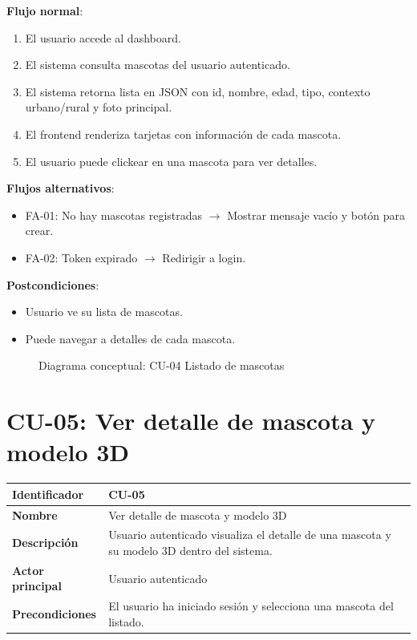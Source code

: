 \documentclass[12pt,a4paper]{article}
\begin{document}
\vspace{0.5em}

\textbf{Flujo normal}:
\begin{enumerate}[leftmargin=*]
    \item El usuario accede al dashboard.
    \item El sistema consulta mascotas del usuario autenticado.
    \item El sistema retorna lista en JSON con id, nombre, edad, tipo, contexto urbano/rural y foto principal.
    \item El frontend renderiza tarjetas con informaci\'on de cada mascota.
    \item El usuario puede clickear en una mascota para ver detalles.
\end{enumerate}

\textbf{Flujos alternativos}:
\begin{itemize}[leftmargin=*]
    \item FA-01: No hay mascotas registradas $\rightarrow$ Mostrar mensaje vac\'io y bot\'on para crear.
    \item FA-02: Token expirado $\rightarrow$ Redirigir a login.
\end{itemize}

\textbf{Postcondiciones}:
\begin{itemize}[leftmargin=*]
    \item Usuario ve su lista de mascotas.
    \item Puede navegar a detalles de cada mascota.
\end{itemize}

\begin{figure}[h]
\centering
{}
\caption{Diagrama conceptual: CU-04 Listado de mascotas}
\end{figure}

\newpage

\section{CU-05: Ver detalle de mascota y modelo 3D}

\begin{tabular}{|p{3.5cm}|p{10cm}|}
\hline
\textbf{Identificador} & CU-05 \\
\hline
\textbf{Nombre} & Ver detalle de mascota y modelo 3D \\
\hline
\textbf{Descripci\'on} & Usuario autenticado visualiza el detalle de una mascota y su modelo 3D dentro del sistema. \\
\hline
\textbf{Actor principal} & Usuario autenticado \\
\hline
\textbf{Precondiciones} & El usuario ha iniciado sesi\'on y selecciona una mascota del listado. \\
\hline
\end{tabular}
\end{document}

